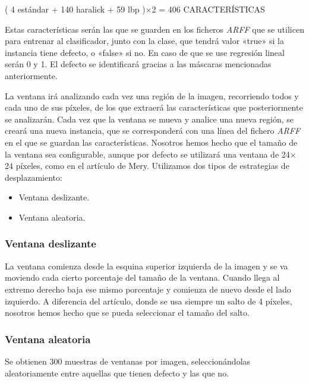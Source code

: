 \begin{center}
( 4 estándar + 140 haralick + 59 lbp )$\times$2 = 406 CARACTERÍSTICAS
\end{center}

Estas características serán las que se guarden en los ficheros \textit{ARFF} que se utilicen para entrenar
al clasificador, junto con la clase, que tendrá valor «true» si la instancia tiene defecto, o «false» si
no. En caso de que se use regresión lineal serán 0 y 1. El defecto se identificará gracias a las máscaras mencionadas anteriormente.

La ventana irá analizando cada vez una región de la imagen, recorriendo todos y cada uno de sus píxeles, de los que extraerá las características que posteriormente se analizarán. Cada vez que la ventana se mueva y analice una nueva región, se creará una nueva instancia, que se corresponderá con una línea del fichero \textit{ARFF} en el que se guardan las características. Nosotros hemos hecho que el tamaño de la ventana sea configurable, aunque por defecto se utilizará una ventana de 24$\times$24 píxeles, como en el artículo de Mery. Utilizamos dos tipos de estrategias de desplazamiento:

\begin{itemize}
\item Ventana deslizante.
\item Ventana aleatoria.
\end{itemize}

\subsubsection*{Ventana deslizante}
La ventana comienza desde la esquina superior izquierda de la imagen y se va moviendo cada cierto porcentaje del tamaño de la ventana. Cuando llega al extremo derecho baja ese mismo porcentaje y comienza de nuevo desde el lado izquierdo. A diferencia del artículo, donde se usa siempre un salto de 4 píxeles, nosotros hemos hecho que se pueda seleccionar el tamaño del salto.


\subsubsection*{Ventana aleatoria}
Se obtienen 300 muestras de ventanas por imagen, seleccionándolas aleatoriamente entre aquellas que tienen defecto y las que no.


